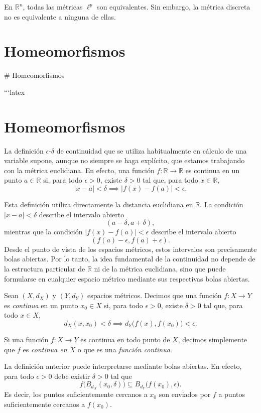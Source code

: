 \begin{example}
En $\mathbb{R}^n$, todas las métricas $\ell^p$ son equivalentes. Sin embargo, la métrica discreta no es equivalente a ninguna de ellas.
\end{example}

\section{Homeomorfismos}

# Homeomorfismos

```latex
\section{Homeomorfismos}

La definición $\epsilon$-$\delta$ de continuidad que se utiliza
habitualmente en cálculo de una variable supone, aunque no siempre se
haga explícito, que estamos trabajando con la métrica euclidiana. En
efecto, una función $f\colon \mathbb{R}\to\mathbb{R}$ es continua en un
punto $a\in\mathbb{R}$ si, para todo $\epsilon>0$, existe
$\delta>0$ tal que, para todo $x\in\mathbb{R}$,
\[
|x-a|<\delta \implies |f(x)-f(a)|<\epsilon.
\]

Esta definición utiliza directamente la distancia euclidiana en
$\mathbb{R}$. La condición $|x-a|<\delta$ describe el intervalo abierto
\[
(a-\delta,a+\delta),
\]
mientras que la condición $|f(x)-f(a)|<\epsilon$ describe el intervalo
abierto
\[
(f(a)-\epsilon,f(a)+\epsilon).
\]
Desde el punto de vista de los espacios métricos, estos intervalos son
precisamente bolas abiertas. Por lo tanto, la idea fundamental de la
continuidad no depende de la estructura particular de $\mathbb{R}$ ni
de la métrica euclidiana, sino que puede formularse en cualquier espacio
métrico mediante sus respectivas bolas abiertas.

\begin{definition}
\label{def:continuidad-metrica}
Sean $(X,d_X)$ y $(Y,d_Y)$ espacios métricos. Decimos que una función
$f\colon X\to Y$ es \emph{continua} en un punto $x_0\in X$ si, para todo
$\epsilon>0$, existe $\delta>0$ tal que, para todo $x\in X$,
\[
d_X(x,x_0)<\delta
\implies
d_Y\bigl(f(x),f(x_0)\bigr)<\epsilon.
\]
\end{definition}

Si una función $f\colon X\to Y$ es continua en todo punto de $X$,
decimos simplemente que $f$ es \emph{continua en $X$} o que es una
\emph{función continua}.

La definición anterior puede interpretarse mediante bolas abiertas. En
efecto, para todo $\epsilon>0$ debe existir $\delta>0$ tal que
\[
f\bigl(B_{d_X}(x_0,\delta)\bigr)
\subseteq
B_{d_Y}\bigl(f(x_0),\epsilon\bigr).
\]
Es decir, los puntos suficientemente cercanos a $x_0$ son enviados por
$f$ a puntos suficientemente cercanos a $f(x_0)$.


